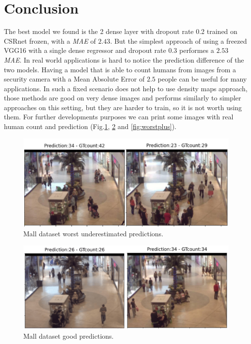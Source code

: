 \documentclass[10pt,twocolumn,letterpaper]{article}
\begin{document}
\section{Conclusion}
The best model we found is the 2 dense layer with dropout rate 0.2 trained on CSRnet frozen, with a \textit{MAE} of $2.43$. But the simplest approach of using a freezed VGG16 with a single dense regressor and dropout rate $0.3$ performes a $2.53$ \textit{MAE}. In real world applications is hard to notice the prediction difference of the two models. Having a model that is able to count humans from images from a security camera with a Mean Absolute Error of $2.5$ people can be useful for many applications. In such a fixed scenario does not help to use density maps approach, those methods are good on very dense images and performs similarly to simpler approaches on this setting, but they are harder to train, so it is not worth using them. For further developments purposes we can print some images with real human count and prediction (Fig.\ref{fig:worst}, \ref{fig:best} and \ref{fig:worstplus}). 

\begin{figure}[h!]%
	\includegraphics[width=1\columnwidth]{pics/low.png}
	\centering
	\caption{Mall dataset worst underestimated predictions.}
	\centering
	\label{fig:worst}
\end{figure}

\begin{figure}[h!]%
	\includegraphics[width=1\columnwidth]{pics/perfect.png}
	\centering
	\caption{Mall dataset good predictions.}
	\centering
	\label{fig:best}
\end{figure}
\end{document}
